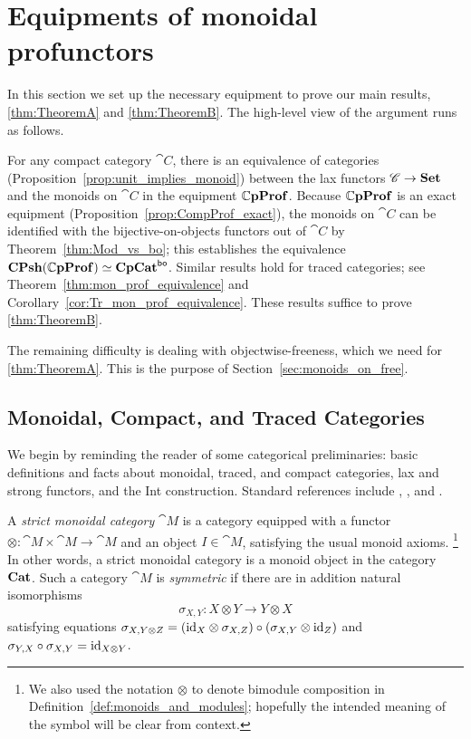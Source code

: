 \documentclass[11pt,oneside,article]{memoir}
\begin{document}
\chapter{Equipments of monoidal profunctors}
  \label{chap:equipments_monoidal_profunctors}

In this section we set up the necessary equipment to prove our main results, \ref{thm:TheoremA} and
\ref{thm:TheoremB}. The high-level view of the argument runs as follows.

For any compact category $\cat{C}$, there is an equivalence of categories
(Proposition~\ref{prop:unit_implies_monoid}) between the lax functors $\mathscr{C}\to\mathbf{Set}$ and the
monoids on $\cat{C}$ in the equipment $\mathbb{C}\mathbf{pProf}$. Because $\mathbb{C}\mathbf{pProf}$ is an exact equipment
(Proposition~\ref{prop:CompProf_exact}), the monoids on $\cat{C}$ can be identified with the
bijective-on-objects functors out of $\cat{C}$ by Theorem~\ref{thm:Mod_vs_bo}; this establishes the
equivalence $\mathbf{CPsh}(\mathbb{C}\mathbf{pProf})\simeq\mathbf{CpCat}^{\mathsf{bo}}$. Similar results hold for traced categories; see
Theorem~\ref{thm:mon_prof_equivalence} and Corollary~\ref{cor:Tr_mon_prof_equivalence}. These
results suffice to prove \ref{thm:TheoremB}.

The remaining difficulty is dealing with objectwise-freeness, which we need for \ref{thm:TheoremA}.
This is the purpose of Section~\ref{sec:monoids_on_free}.

\section{Monoidal, Compact, and Traced Categories}
  \label{sec:monoidal,compact,traced}

We begin by reminding the reader of some categorical preliminaries: basic definitions and facts
about monoidal, traced, and compact categories, lax and strong functors, and the Int construction.
Standard references include \cite{KellyLaplaza}, \cite{JoyalStreet}, and \cite{JoyalStreetVerity}.

A \emph{strict monoidal category} $\cat{M}$ is a category equipped with a functor
$\otimes\colon\cat{M}\times\cat{M}\to\cat{M}$ and an object $I\in\cat{M}$, satisfying the usual
monoid axioms.%
\footnote{
  We also used the notation $\otimes$ to denote bimodule composition in
  Definition~\ref{def:monoids_and_modules}; hopefully the intended meaning of the symbol will be
  clear from context.
}
In other words, a strict monoidal category is a monoid object in the category $\mathbf{Cat}$. Such a
category $\cat{M}$ is \emph{symmetric} if there are in addition natural isomorphisms
\[
  \sigma_{X,Y}\colon X\otimes Y\to Y\otimes X
\]
satisfying equations $\sigma_{X,Y\otimes Z}=(\mathrm{id}_X\otimes\sigma_{X,Z})\circ(\sigma_{X,Y}\otimes
\mathrm{id}_Z)$ and $\sigma_{Y,X}\circ\sigma_{X,Y}=\mathrm{id}_{X\otimes Y}$.
\end{document}
